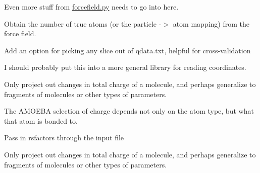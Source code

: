 
\begin{DoxyRefList}
\item[\label{todo__todo000008}%
\Hypertarget{todo__todo000008}%
Namespace \hyperlink{namespaceforcebalance_1_1gmxio}{forcebalance.gmxio} ]Even more stuff from \hyperlink{forcefield_8py}{forcefield.\+py} needs to go into here. 
\item[\label{todo__todo000001}%
\Hypertarget{todo__todo000001}%
Member \hyperlink{classsrc_1_1abinitio_1_1AbInitio_a05142b8321814feceac1a39ab338615e}{src.abinitio.Ab\+Initio.\+\_\+\+\_\+init\+\_\+\+\_\+} (self, options, tgt\+\_\+opts, forcefield)]Obtain the number of true atoms (or the particle -\/$>$ atom mapping) from the force field.  
\item[\label{todo__todo000002}%
\Hypertarget{todo__todo000002}%
Member \hyperlink{classsrc_1_1abinitio_1_1AbInitio_afacfa5d84fb6638dcfad3bff7f14d48f}{src.abinitio.Ab\+Initio.read\+\_\+reference\+\_\+data} (self)]Add an option for picking any slice out of qdata.\+txt, helpful for cross-\/validation 
\item[\label{todo__todo000003}%
\Hypertarget{todo__todo000003}%
Member \hyperlink{classsrc_1_1counterpoise_1_1Counterpoise_abe282b072c0d1c5b5a3e2438ffc911c4}{src.counterpoise.Counterpoise.loadxyz} (self, fnm)]I should probably put this into a more general library for reading coordinates.  
\item[\label{todo__todo000005}%
\Hypertarget{todo__todo000005}%
Member \hyperlink{classsrc_1_1ffyapf_1_1FF_ab540e44d9ab8dccb60048694e460c4fc}{src.ffyapf.FF.mktransmat} (self)]Only project out changes in total charge of a molecule, and perhaps generalize to fragments of molecules or other types of parameters. 

The A\+M\+O\+E\+BA selection of charge depends not only on the atom type, but what that atom is bonded to.  
\item[\label{todo__todo000004}%
\Hypertarget{todo__todo000004}%
Member \hyperlink{classsrc_1_1ffyapf_1_1FF_a392d73844890c87025d9a5ee2e24dc80}{src.ffyapf.FF.rsmake} (self, printfacs=True)]Pass in rsfactors through the input file 
\item[\label{todo__todo000007}%
\Hypertarget{todo__todo000007}%
Member \hyperlink{classsrc_1_1forcefield_1_1FF_add591c39f6d9a4965a7c0ecefae232f6}{src.forcefield.FF.mktransmat} (self)]Only project out changes in total charge of a molecule, and perhaps generalize to fragments of molecules or other types of parameters. 


\end{DoxyRefList}
